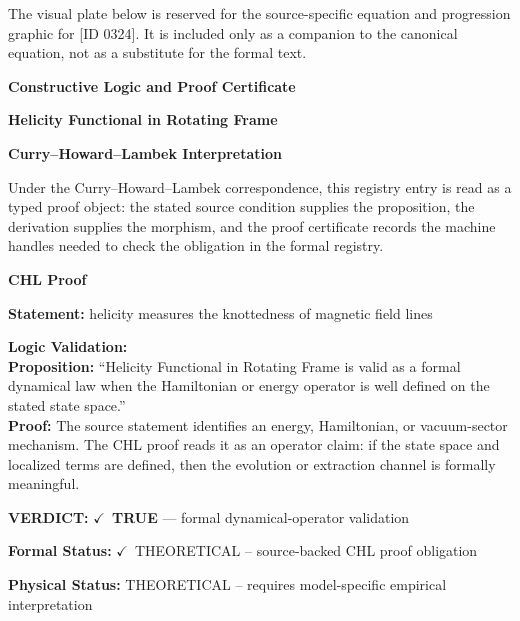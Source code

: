 \begingroup\footnotesize\sloppy
The visual plate below is reserved for the source-specific equation and progression graphic for [ID 0324]. It is included only as a companion to the canonical equation, not as a substitute for the formal text.
\par\endgroup
\ifTZPDarkEdition
{}
\fi

\clearpage
\begingroup\tzpsupportsetup
\noindent\textbf{\fontsize{10.8pt}{12.8pt}\selectfont [ID 0324] Constructive Logic and Proof Certificate}\par
\noindent\textbf{\fontsize{10pt}{12pt}\selectfont Helicity Functional in Rotating Frame}\par
\vspace{0.45em}
\begingroup
\footnotesize
\setlength{\parskip}{0.22em}
\setlength{\parindent}{0pt}
\noindent\textbf{Curry--Howard--Lambek Interpretation}\par
Under the Curry--Howard--Lambek correspondence, this registry entry is read as a typed proof
object: the stated source condition supplies the proposition, the derivation supplies the
morphism, and the proof certificate records the machine handles needed to check the obligation
in the formal registry.

\vspace{0.45em}
\noindent\textbf{CHL Proof}\par
\textbf{Statement:} helicity measures the knottedness of magnetic field lines

\textbf{Logic Validation:}\\
\textbf{Proposition:} ``Helicity Functional in Rotating Frame is valid as a formal dynamical law when the
Hamiltonian or energy operator is well defined on the stated state space.''\\
\textbf{Proof:} The source statement identifies an energy, Hamiltonian, or vacuum-sector mechanism. The
CHL proof reads it as an operator claim: if the state space and localized terms are
defined, then the evolution or extraction channel is formally meaningful.

\textbf{VERDICT:} \ensuremath{\checkmark}\ \textbf{TRUE} --- formal dynamical-operator validation

\textbf{Formal Status:} \ensuremath{\checkmark}\ THEORETICAL -- source-backed CHL proof obligation

\textbf{Physical Status:} THEORETICAL -- requires model-specific empirical interpretation
\par\vspace{0.45em}
\par
\ifTZPDarkEdition
{}
\fi
\endgroup
\endgroup

